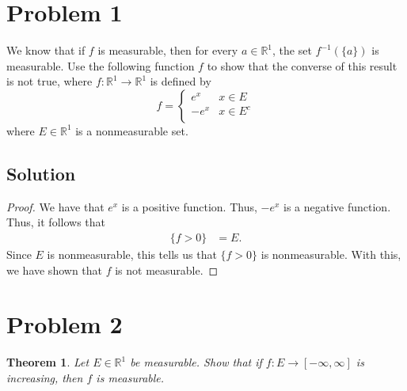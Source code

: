 \documentclass[10pt,a4paper]{article}
\author{Jeremiah Givens}
\theoremstyle{theorem}
\newtheorem{theorem}{Theorem}
\theoremstyle{definition}
\begin{document}
\section*{Problem 1}
We know that if $f$ is measurable, then for every $a \in \mathbb{R}^1$, the set $f^{-1}(\{a\})$ is measurable. Use the following function $f$ to show that the converse of this result is not true, where $f: \mathbb{R}^1 \to \mathbb{R}^1$ is defined by
\[   f = \left\{
\begin{array}{ll}
      e^x & x \in E \\
      -e^x & x \in E^c \\
\end{array} 
\right. \]
where $E \in \mathbb{R}^1$ is a nonmeasurable set.

\subsection*{Solution}
\begin{proof}
We have that $e^x$ is a positive function. Thus, $-e^x$ is a negative function. Thus, it follows that
\begin{align*}
\{f > 0\} &= E.
\end{align*}
Since $E$ is nonmeasurable, this tells us that $\{f > 0\}$ is nonmeasurable. With this, we have shown that $f$ is not measurable.
\end{proof}

\section*{Problem 2}
\begin{theorem}
Let $E \in \mathbb{R}^1$ be measurable. Show that if $f: E \to [-\infty, \infty ]$ is increasing, then $f$ is measurable.
\end{theorem}
\end{document}

